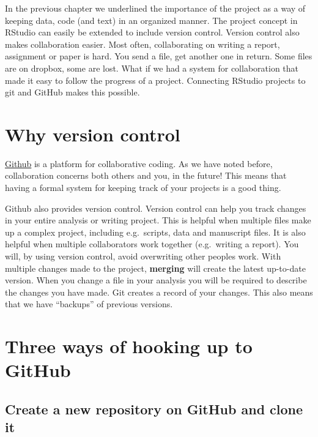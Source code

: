\documentclass[
  11pt,
  letterpaper,
]{scrbook}
\begin{document}
In the previous chapter we underlined the importance of the project as a
way of keeping data, code (and text) in an organized manner. The project
concept in RStudio can easily be extended to include version control.
Version control also makes collaboration easier. Most often,
collaborating on writing a report, assignment or paper is hard. You send
a file, get another one in return. Some files are on dropbox, some are
lost. What if we had a system for collaboration that made it easy to
follow the progress of a project. Connecting RStudio projects to git and
GitHub makes this possible.

\hypertarget{why-version-control}{%
\section{Why version control}\label{why-version-control}}

\href{www.github.com}{Github} is a platform for collaborative coding. As
we have noted before, collaboration concerns both others and you, in the
future! This means that having a formal system for keeping track of your
projects is a good thing.

Github also provides version control. Version control can help you track
changes in your entire analysis or writing project. This is helpful when
multiple files make up a complex project, including e.g.~scripts, data
and manuscript files. It is also helpful when multiple collaborators
work together (e.g.~writing a report). You will, by using version
control, avoid overwriting other peoples work. With multiple changes
made to the project, \textbf{merging} will create the latest up-to-date
version. When you change a file in your analysis you will be required to
describe the changes you have made. Git creates a record of your
changes. This also means that we have ``backups'' of previous versions.

\hypertarget{three-ways-of-hooking-up-to-github}{%
\section{Three ways of hooking up to
GitHub}\label{three-ways-of-hooking-up-to-github}}

\hypertarget{create-a-new-repository-on-github-and-clone-it}{%
\subsection{Create a new repository on GitHub and clone
it}\label{create-a-new-repository-on-github-and-clone-it}}
\end{document}
